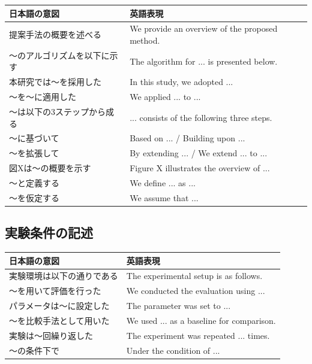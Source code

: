 \begin{table}[H]
\centering
\small
\begin{tabular}{p{4cm}p{6cm}}
\toprule
日本語の意図 & 英語表現 \\
\midrule
提案手法の概要を述べる & We provide an overview of the proposed method. \\
〜のアルゴリズムを以下に示す & The algorithm for ... is presented below. \\
本研究では〜を採用した & In this study, we adopted ... \\
〜を〜に適用した & We applied ... to ... \\
〜は以下の3ステップから成る & ... consists of the following three steps. \\
〜に基づいて & Based on ... / Building upon ... \\
〜を拡張して & By extending ... / We extend ... to ... \\
図Xは〜の概要を示す & Figure X illustrates the overview of ... \\
〜と定義する & We define ... as ... \\
〜を仮定する & We assume that ... \\
\bottomrule
\end{tabular}
\end{table}

\subsection*{実験条件の記述}

\begin{table}[H]
\centering
\small
\begin{tabular}{p{4cm}p{6cm}}
\toprule
日本語の意図 & 英語表現 \\
\midrule
実験環境は以下の通りである & The experimental setup is as follows. \\
〜を用いて評価を行った & We conducted the evaluation using ... \\
パラメータは〜に設定した & The parameter was set to ... \\
〜を比較手法として用いた & We used ... as a baseline for comparison. \\
実験は〜回繰り返した & The experiment was repeated ... times. \\
〜の条件下で & Under the condition of ... \\
\bottomrule
\end{tabular}
\end{table}


